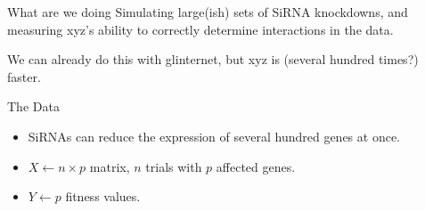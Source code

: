 \begin{frame}{What are we doing}
Simulating large(ish) sets of SiRNA knockdowns, and measuring xyz's ability to correctly determine interactions in the data.

We can already do this with glinternet, but xyz is (several hundred times?) faster.


\end{frame}
\begin{frame}{The Data}
\begin{itemize}
	\item SiRNAs can reduce the expression of several hundred genes at once.
	\item $X \leftarrow n \times p$ matrix, $n$ trials with $p$ affected genes.
	\item $Y \leftarrow p$ fitness values.
\end{itemize}


\end{frame}

